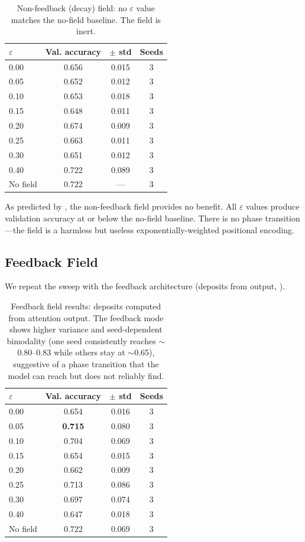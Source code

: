 \documentclass[11pt,a4paper]{article}
\newcommand{\evap}{\varepsilon}
\begin{document}
\begin{table}[h]
\centering
\begin{tabular}{@{}lccc@{}}
\toprule
$\evap$ & Val. accuracy & $\pm$ std & Seeds \\
\midrule
0.00 & 0.656 & 0.015 & 3 \\
0.05 & 0.652 & 0.012 & 3 \\
0.10 & 0.653 & 0.018 & 3 \\
0.15 & 0.648 & 0.011 & 3 \\
0.20 & 0.674 & 0.009 & 3 \\
0.25 & 0.663 & 0.011 & 3 \\
0.30 & 0.651 & 0.012 & 3 \\
0.40 & 0.722 & 0.089 & 3 \\
\addlinespace
No field & 0.722 & --- & 3 \\
\bottomrule
\end{tabular}
\caption{Non-feedback (decay) field: no $\evap$ value matches the
no-field baseline. The field is inert.}
\label{tab:decay_results}
\end{table}

As predicted by , the non-feedback field provides
no benefit. All $\evap$ values produce validation accuracy at or below
the no-field baseline. There is no phase transition---the field is a
harmless but useless exponentially-weighted positional encoding.

\subsection{Feedback Field}

We repeat the sweep with the feedback architecture (deposits from
output, ).

\begin{table}[h]
\centering
\begin{tabular}{@{}lccc@{}}
\toprule
$\evap$ & Val. accuracy & $\pm$ std & Seeds \\
\midrule
0.00 & 0.654 & 0.016 & 3 \\
0.05 & \textbf{0.715} & 0.080 & 3 \\
0.10 & 0.704 & 0.069 & 3 \\
0.15 & 0.654 & 0.015 & 3 \\
0.20 & 0.662 & 0.009 & 3 \\
0.25 & 0.713 & 0.086 & 3 \\
0.30 & 0.697 & 0.074 & 3 \\
0.40 & 0.647 & 0.018 & 3 \\
\addlinespace
No field & 0.722 & 0.069 & 3 \\
\bottomrule
\end{tabular}
\caption{Feedback field results: deposits computed from attention output.
The feedback mode shows higher variance and seed-dependent bimodality
(one seed consistently reaches $\sim$0.80--0.83 while others stay at
$\sim$0.65), suggestive of a phase transition that the model can reach
but does not reliably find.}
\label{tab:feedback_results}
\end{table}
\end{document}
